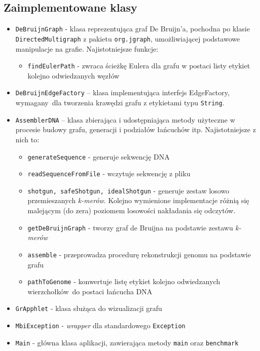 \documentclass{article}
\begin{document}
\subsection{Zaimplementowane klasy}
\begin{itemize}
\item \texttt{DeBruijnGraph} - klasa reprezentująca graf De Bruijn'a, pochodna po klasie \\ \texttt{DirectedMultigraph} z pakietu \texttt{org.jgraph}, umożliwiającej podstawowe manipulacje na grafie. Najistotniejsze funkcje:
\begin{itemize}
\item \texttt{findEulerPath} - zwraca ścieżkę Eulera dla grafu w postaci listy etykiet kolejno odwiedzanych węzłów
\end{itemize}
\item \texttt{DeBruijnEdgeFactory} – klasa implementująca interfejs EdgeFactory, wymagany~dla tworzenia krawędzi grafu z etykietami typu \texttt{String}.
\item \texttt{AssemblerDNA} – klasa zbierająca i udostępniająca metody użyteczne w procesie budowy grafu, generacji i podziałów łańcuchów itp. Najistotniejsze z nich to:
\begin{itemize}
\item \texttt{generateSequence} - generuje sekwencję DNA
\item \texttt{readSequenceFromFile} - wczytuje sekwencję z pliku
\item \texttt{shotgun, safeShotgun, idealShotgun} - generuje zestaw losowo przemieszanych \textit{k-merów}. Kolejno wymienione implementacje różnią się malejącym (do zera) poziomem losowości nakładania się odczytów.
\item \texttt{getDeBruijnGraph} - tworzy graf de Bruijna na podstawie zestawu \textit{k-merów}
\item \texttt{assemble} - przeprowadza procedurę rekonstrukcji genomu na podstawie grafu
\item \texttt{pathToGenome} - konwertuje listę etykiet kolejno odwiedzanych wierzchołków~do postaci łańcucha DNA
\end{itemize}
\item \texttt{GrApphlet} - klasa służąca do wizualizacji grafu
\item \texttt{MbiException} - \textit{wrapper} dla standardowego \texttt{Exception}
\item \texttt{Main} - główna klasa aplikacji, zawierająca metody \texttt{main} oraz \texttt{benchmark}
\end{itemize}
\end{document}
